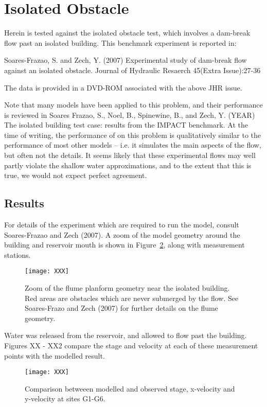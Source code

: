 
\section{Isolated Obstacle}

Herein \anuga{} is tested against the isolated obstacle test, which involves a dam-break flow past an isolated building. This benchmark experiment is reported in:

Soares-Frazao, S. and Zech, Y. (2007) Experimental study of dam-break flow against an isolated obstacle. Journal of Hydraulic Resaerch 45(Extra Issue):27-36

The data is provided in a DVD-ROM associated with the above JHR issue.

Note that many models have been applied to this problem, and their performance is reviewed in Soares Frazao, S., Noel, B., Spinewine, B., and Zech, Y. (YEAR) The isolated building test case: results from the IMPACT benchmark. At the time of writing, the performance of \anuga{} on this problem is qualitatively similar to the performance of most other models -- i.e. it simulates the main aspects of the flow, but often not the details. It seems likely that these experimental flows may well partly violate the shallow water approximations, and to the extent that this is true, we would not expect perfect agreement.

\subsection{Results}
For details of the experiment which are required to run the model, consult Soares-Frazao and Zech (2007). A zoom of the model geometry around the building and reservoir mouth is shown in Figure~\ref{urbanflow_geom}, along with measurement stations. 
\begin{figure}
\texttt{[image: XXX]}
\caption{Zoom of the flume planform geometry near the isolated building. Red areas are obstacles which are never submerged by the flow. See Soares-Frazo and Zech (2007) for further details on the flume geometry.}
\label{urbanflow_geom}
\end{figure}

Water was released from the reservoir, and allowed to flow past the building. Figures XX - XX2 compare the stage and velocity at each of these measurement points with the modelled result. 
\begin{figure}
\texttt{[image: XXX]}
\caption{Comparison betweeen modelled and observed stage, x-velocity and y-velocity at sites G1-G6.}
\label{urbanflow_geom}
\end{figure}



\endinput
